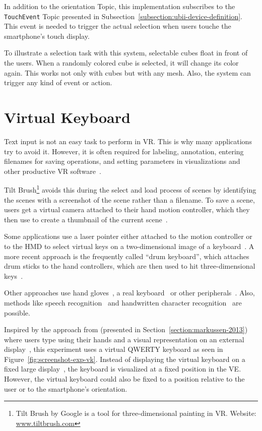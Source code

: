 In addition to the orientation Topic, this implementation subscribes to the \lstinline{TouchEvent} Topic presented in Subsection~\ref{subsection:ubii-device-definition}. This event is needed to trigger the actual selection when users touche the smartphone's touch display.

To illustrate a selection task with this system, selectable cubes float in front of the users. 
When a randomly colored cube is selected, it will change its color again. This works not only with cubes but with any mesh. Also, the system can trigger any kind of event or action.


\section{Virtual Keyboard}\label{section:virtual-keyboard}

Text input is not an easy task to perform in \gls{VR}. This is why many applications try to avoid it. However, it is often required for labeling, annotation, entering filenames for saving operations, and setting parameters in visualizations and other productive \gls{VR} software~\cite[2154]{Rhoton.2002}. 

Tilt Brush\footnote{Tilt Brush by Google is a tool for three-dimensional painting in VR. Website: \href{https://www.tiltbrush.com/}{www.tiltbrush.com}} avoids this during the select and load process of scenes by identifying the scenes with a screenshot of the scene rather than a filename. To save a scene, users get a virtual camera attached to their hand motion controller, which they then use to create a thumbnail of the current scene~\cite{GoogleLLC.2019}. %

Some applications use a laser pointer either attached to the motion controller or to the \gls{HMD} to select virtual keys on a two-dimensional image of a keyboard~\cite{Speicher.2018}. A more recent approach is the frequently called \enquote{drum keyboard}, which attaches drum sticks to the hand controllers, which are then used to hit three-dimensional keys~\cite{Weisel.2017}.

Other approaches use hand gloves~\cite{Evans.1999,Rhoton.2002}, a real keyboard~\cite{McGill.2015,Walker.2017} or other peripherals~\cite[111\psq]{Gonzalez.2009}. Also, methods like speech recognition~\cite[2154\psqq]{Rhoton.2002} and handwritten character recognition~\cite[113]{Gonzalez.2009} are possible.

Inspired by the approach from \citeauthor{Markussen.2013} (presented in Section~\ref{section:markussen-2013}) where users type using their hands and a visual representation on an external display~\cite[408]{Markussen.2013}, this experiment uses a virtual QWERTY keyboard as seen in Figure~\ref{fig:screenshot-exp-vk}.
Instead of displaying the virtual keyboard on a fixed large display~\cite[408]{Markussen.2013}, the keyboard is visualized at a fixed position in the \gls{VE}. However, the virtual keyboard could also be fixed to a position relative to the user or to the smartphone's orientation.

